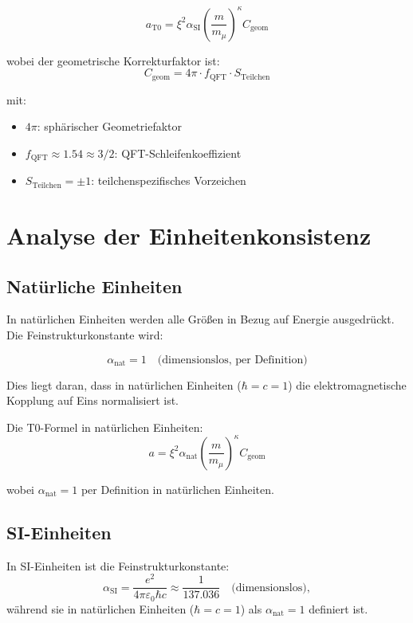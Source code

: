 \documentclass[12pt,a4paper]{article}
\newcommand{\xipar}{\xi}
\newcommand{\alphaSI}{\alpha_{\text{SI}}}
\newcommand{\alphaNAT}{\alpha_{\text{nat}}}
\newcommand{\Cgeom}{C_{\text{geom}}}
\newcommand{\fQFT}{f_{\text{QFT}}}
\newcommand{\Sparticle}{S_{\text{Teilchen}}}
\newcommand{\kappaT}{\kappa}
\newcommand{\mmu}{m_{\mu}}
\begin{document}
	\begin{equation}
		a_{\text{T0}} = \xipar^2 \alphaSI \left(\frac{m}{\mmu}\right)^{\kappaT} \Cgeom
	\end{equation}
	
	wobei der geometrische Korrekturfaktor ist:
	\begin{equation}
		\Cgeom = 4\pi \cdot \fQFT \cdot \Sparticle
	\end{equation}
	
	mit:
	\begin{itemize}
		\item $4\pi$: sphärischer Geometriefaktor
		\item $\fQFT \approx 1.54 \approx 3/2$: QFT-Schleifenkoeffizient
		\item $\Sparticle = \pm 1$: teilchenspezifisches Vorzeichen
	\end{itemize}
	
	\section{Analyse der Einheitenkonsistenz}
	
	\subsection{Natürliche Einheiten}
	
	In natürlichen Einheiten werden alle Größen in Bezug auf Energie ausgedrückt. Die Feinstrukturkonstante wird:
	
	\begin{equation}
		\alphaNAT = 1 \quad \text{(dimensionslos, per Definition)}
	\end{equation}
	
	Dies liegt daran, dass in natürlichen Einheiten ($\hbar = c = 1$) die elektromagnetische Kopplung auf Eins normalisiert ist.
	
	Die T0-Formel in natürlichen Einheiten:
	\begin{equation}
		a = \xipar^2 \alphaNAT \left(\frac{m}{\mmu}\right)^{\kappaT} \Cgeom
	\end{equation}
	
	wobei $\alphaNAT = 1$ per Definition in natürlichen Einheiten.
	
	\subsection{SI-Einheiten}
	
	In SI-Einheiten ist die Feinstrukturkonstante:
	\begin{equation}
		\alphaSI = \frac{e^2}{4\pi\varepsilon_0\hbar c} \approx \frac{1}{137.036} \quad \text{(dimensionslos)},
	\end{equation}
	während sie in natürlichen Einheiten ($\hbar = c = 1$) als $\alphaNAT = 1$ definiert ist.
	
\end{document}
